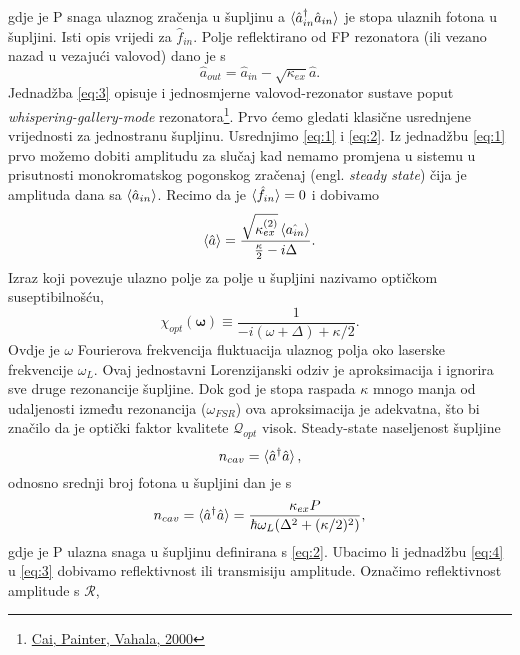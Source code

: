 gdje je P snaga ulaznog zračenja u šupljinu a $\braket{\hat{a}_{in}^{\dagger}\hat{a}_{in}}$ je stopa ulaznih fotona u šupljini. Isti opis vrijedi za $\hat{f}_{in}$.
Polje reflektirano od FP rezonatora (ili vezano nazad u vezajući valovod) dano je s 
\begin{equation}
	\hat{a}_{out} = \hat{a}_{in} - \sqrt{\kappa_{ex}}\hat{a}.
	\label{eq:3}
\end{equation}
Jednadžba \ref{eq:3} opisuje i jednosmjerne valovod-rezonator sustave poput \textit{whispering-gallery-mode} rezonatora\footnote{\href{https://journals.aps.org/prl/abstract/10.1103/PhysRevLett.85.74}{Cai, Painter, Vahala, 2000}}.
Prvo ćemo gledati klasične usrednjene vrijednosti za jednostranu šupljinu. Usrednjimo \ref{eq:1} i \ref{eq:2}. Iz jednadžbu \ref{eq:1} prvo možemo dobiti amplitudu za slučaj kad 
nemamo promjena u sistemu u prisutnosti monokromatskog pogonskog zračenaj (engl. \textit{steady state}) čija je amplituda dana sa $\braket{\hat{a}_{in}}$. Recimo da je $\braket{\hat{f}_{in}} = 0$ i dobivamo
\begin{equation}
	\braket{\hat{a}} = \frac{\sqrt{\kappa_{ex}^{(2)}}\braket{\hat{a_{in}}}}{\frac{\kappa}{2} - i\Delta}.
	\label{eq:4}
\end{equation}
Izraz koji povezuje ulazno polje za polje u šupljini nazivamo optičkom suseptibilnošću,
\begin{equation}
	\chi_{opt}(\mathbf{\omega}) \equiv \frac{1}{-i(\omega+\Delta)+\kappa/2}.
	\label{eq:5}
\end{equation}
Ovdje je $\omega$ Fourierova frekvencija fluktuacija ulaznog polja oko laserske frekvencije $\omega_L$. Ovaj jednostavni Lorenzijanski odziv je aproksimacija i ignorira sve druge rezonancije šupljine. 
Dok god je stopa raspada $\kappa$ mnogo manja od udaljenosti između rezonancija ($\omega_{FSR}$) ova aproksimacija je adekvatna, što bi značilo da je optički faktor kvalitete $\mathcal{Q}_{opt}$ visok. 
Steady-state naseljenost šupljine 
\begin{equation}
	n_{cav} = \braket{\hat{a}^{\dagger}\hat{a}},
	\label{eq:6}
\end{equation}
odnosno srednji broj fotona u šupljini dan je s 
\begin{equation}
	n_{cav} = \braket{\hat{a}^{\dagger}\hat{a}} = \frac{\kappa_{ex}P}{\hbar\omega_L(\Delta^2+(\kappa/2)^2)},
	\label{eq:7}
\end{equation}
gdje je P ulazna snaga u šupljinu definirana s \ref{eq:2}. Ubacimo li jednadžbu \ref{eq:4} u \ref{eq:3} dobivamo reflektivnost ili transmisiju amplitude. Označimo reflektivnost amplitude s $\mathcal{R}$,
